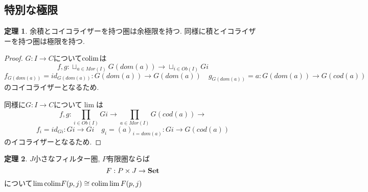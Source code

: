 \documentclass[dvipdfmx,a4paper,11pt]{report}
\newcommand{\colim}{{\rm colim}}
\theoremstyle{definition}
\newtheorem{thm}{定理}
\newcommand{\xr}[1]{\textcolor{red}{#1}}
\begin{document}


\subsection{特別な極限}

 \begin{tcolorbox}
 [colback = white, colframe = green!35!black, fonttitle = \bfseries,breakable = true]
\begin{thm}
\label{thm-eq-pro}
余積とコイコライザーを持つ圏は余極限を持つ. 
同様に積とイコライザーを持つ圏は極限を持つ. 
\end{thm}
\end{tcolorbox}

\begin{proof}
$G : I \to C$について$\colim$は
$$
f,g : \sqcup_{a\in Mor(I)} G(dom(a)) \to \sqcup_{i \in Ob(I)} Gi 
$$
$$
f_{G(dom(a)) }=id_{G(dom(a))} : G(dom(a)) \to G(dom(a))
\quad g_{G(dom(a))}=a : G(dom(a)) \to G(cod(a))
$$
のコイコライザーとなるため. 

同様に$G : I \to C$について$\lim$は
$$
f,g : \prod_{i \in Ob(I)} Gi  \to \prod_{a\in Mor(I)} G(cod(a)) \to 
$$
$$
f_{i}=id_{Gi} : Gi\to Gi
\quad g_{i}=(a)_{i = dom(a)} : Gi\to G(cod(a))
$$
のイコライザーとなるため. 
\end{proof}

 \begin{tcolorbox}
 [colback = white, colframe = green!35!black, fonttitle = \bfseries,breakable = true]
\begin{thm}
\label{thm-filter}
$J$小さなフィルター圏, $P$有限圏ならば
$$
F : P \times J \to \text{{\bf Set}}
$$
について$\lim \colim F(p,j) \cong \colim \lim F(p,j)$
\end{thm}
\end{tcolorbox}
\end{document}
